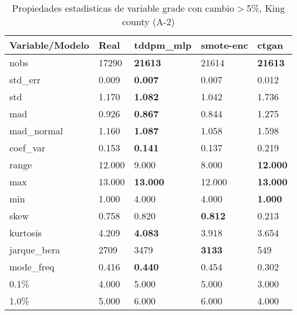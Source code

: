 \begin{table}[H]
\centering
\fontsize{8}{14}\selectfont
\caption{Propiedades estadisticas de variable grade con cambio\ensuremath{>}5\%, King county (A-2)}
\label{table-stats-king county-a-2-grade-short}
\begin{tabular}{|l|m{10em}|m{10em}|m{10em}|m{10em}|}
\hline
 \rowcolor[gray]{0.8}
Variable/Modelo & Real & tddpm\_mlp & smote-enc & ctgan \\
\hline nobs & 17290 & \bfseries 21613 & \cellcolor[rgb]{0.9, 0.54, 0.52} 21614 & \bfseries 21613 \\
\hline std\_err & 0.009 & \bfseries 0.007 & 0.007 & \cellcolor[rgb]{0.9, 0.54, 0.52} 0.012 \\
\hline std & 1.170 & \bfseries 1.082 & 1.042 & \cellcolor[rgb]{0.9, 0.54, 0.52} 1.736 \\
\hline mad & 0.926 & \bfseries 0.867 & 0.844 & \cellcolor[rgb]{0.9, 0.54, 0.52} 1.275 \\
\hline mad\_normal & 1.160 & \bfseries 1.087 & 1.058 & \cellcolor[rgb]{0.9, 0.54, 0.52} 1.598 \\
\hline coef\_var & 0.153 & \bfseries 0.141 & 0.137 & \cellcolor[rgb]{0.9, 0.54, 0.52} 0.219 \\
\hline range & 12.000 & 9.000 & \cellcolor[rgb]{0.9, 0.54, 0.52} 8.000 & \bfseries 12.000 \\
\hline max & 13.000 & \bfseries 13.000 & \cellcolor[rgb]{0.9, 0.54, 0.52} 12.000 & \bfseries 13.000 \\
\hline min & 1.000 & \cellcolor[rgb]{0.9, 0.54, 0.52} 4.000 & \cellcolor[rgb]{0.9, 0.54, 0.52} 4.000 & \bfseries 1.000 \\
\hline skew & 0.758 & 0.820 & \bfseries 0.812 & \cellcolor[rgb]{0.9, 0.54, 0.52} 0.213 \\
\hline kurtosis & 4.209 & \bfseries 4.083 & 3.918 & \cellcolor[rgb]{0.9, 0.54, 0.52} 3.654 \\
\hline jarque\_bera & 2709 & 3479 & \bfseries 3133 & \cellcolor[rgb]{0.9, 0.54, 0.52} 549 \\
\hline mode\_freq & 0.416 & \bfseries 0.440 & 0.454 & \cellcolor[rgb]{0.9, 0.54, 0.52} 0.302 \\
\hline 0.1\% & 4.000 & 5.000 & 5.000 & 3.000 \\
\hline 1.0\% & 5.000 & 6.000 & 6.000 & 4.000 \\
\hline
\end{tabular}
\end{table}
